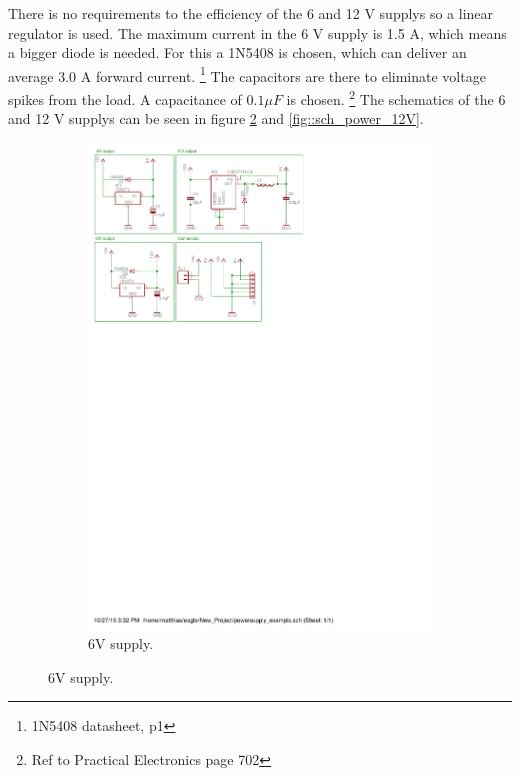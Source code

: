 There is no requirements to the efficiency of the 6 and 12 V supplys so a linear regulator is used.
The maximum current in the 6 V supply is 1.5 A, which means a bigger diode is needed.
For this a 1N5408 is chosen, which can deliver an average 3.0 A forward current.
\footnote{1N5408 datasheet, p1}
The capacitors are there to eliminate voltage spikes from the load. A capacitance of $0.1 \mu F$ is chosen.
\footnote{Ref to Practical Electronics page 702}
The schematics of the 6 and 12 V supplys can be seen in figure \ref{fig::sch_power_6V} and \ref{fig::sch_power_12V}.

\begin{figure}[H] %
\centering
\begin{subfigure}{0.3\linewidth}
\centering
\includegraphics[scale=0.8,trim={0 24cm 15.7cm 0.6cm},clip]{img/powersupply.pdf}
\caption{6V supply.}
\label{fig::sch_power_6V}

\end{subfigure}
\end{figure}
